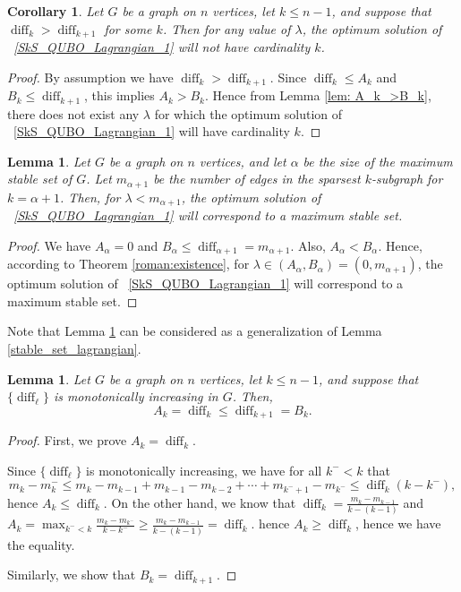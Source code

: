 \documentclass{article}
\DeclareMathOperator{\diff}{diff}
\newtheorem{lem}[thm]{Lemma}
\newtheorem{cor}[thm]{Corollary}
\begin{document}
\begin{cor} \label{cor: diff_k>diff_k_plus_1}
    Let $G$ be a graph on $n$ vertices, let $k \leq n - 1$, and suppose that $\diff_k > \diff_{k+1}$ for some $k$. Then for any value of $\lambda$, the optimum solution of ~\eqref{SkS_QUBO_Lagrangian_1} will not have cardinality $k$.
\end{cor}

\begin{proof}
    By assumption we  have $\diff_{k} > \diff_{k+1}$. Since $\diff_{k} \le A_{k}$ and $B_{k} \le \diff_{k+1}$, this implies $A_{k} > B_{k}$. Hence from Lemma \ref{lem: A_k_>B_k}, there does not exist any $\lambda$ for which the optimum solution of ~\eqref{SkS_QUBO_Lagrangian_1} will have cardinality $k$.
\end{proof}

\begin{lem} \label{lem: MIS_for_lam}
    Let $G$ be a graph on $n$ vertices, and let $\alpha$ be the size of the maximum stable set of $G$. Let $m_{\alpha+1}$ be the number of edges in the sparsest $k$-subgraph for $k = \alpha+1$. Then, for $\lambda < m_{\alpha + 1}$, the optimum solution of ~\eqref{SkS_QUBO_Lagrangian_1} will correspond to a maximum stable set.
\end{lem}

\begin{proof}
We have $A_{\alpha} = 0$ and $B_{\alpha} \le \diff_{\alpha+1} = m_{\alpha+1}$. Also, $A_{\alpha} < B_{\alpha}$. Hence, according to Theorem \ref{roman:existence}, for $\lambda \in (A_{\alpha}, B_{\alpha}) = (0,m_{\alpha+1})$, the optimum solution of ~\eqref{SkS_QUBO_Lagrangian_1} will correspond to a maximum stable set.
\end{proof}


Note that Lemma \ref{lem: MIS_for_lam} can be considered as a generalization of  Lemma \ref{stable_set_lagrangian}.





\begin{lem}\label{lambda_tighter_bounds}
Let $G$ be a graph on $n$ vertices, let $k \leq n - 1$, and suppose that $\{\diff_\ell\}$ is monotonically increasing in $G$. Then, 
$$
A_k = \diff_k \le \diff_{k+1}  = B_k.
$$
\end{lem}

\begin{proof}
First, we prove $
A_k = \diff_k$.

Since $\{\diff_\ell\}$ is monotonically increasing, we have for all $k^-<k$ that  
$$m_k-m_k^- \le m_k-m_{k-1}+m_{k-1}-m_{k-2}+\cdots+m_{k^-+1}-m_{k^-} \le \diff_k(k-k^-), $$
hence 
$    A_k \le  \diff_k.$
On the other hand, we know that $\diff_k = \frac{m_k-m_{k-1}}{k-(k-1)}$ and 
$A_k= \max_{k^{-}<k}\frac{m_k-m_{k^-}}{k-k^-} \ge \frac{m_k-m_{k-1}}{k-(k-1)} = \diff_k $. hence $A_k\ge \diff_k$, hence we have the equality.

Similarly, we show that $B_k = \diff_{k+1}$.
\end{proof}
\end{document}
